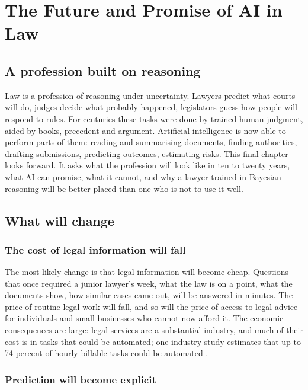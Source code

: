 \chapter{The Future and Promise of AI in Law}
\label{ch:future}

\section{A profession built on reasoning}

Law is a profession of reasoning under uncertainty. Lawyers predict what courts will do, judges decide what probably happened, legislators guess how people will respond to rules. For centuries these tasks were done by trained human judgment, aided by books, precedent and argument. Artificial intelligence is now able to perform parts of them: reading and summarising documents, finding authorities, drafting submissions, predicting outcomes, estimating risks. This final chapter looks forward. It asks what the profession will look like in ten to twenty years, what AI can promise, what it cannot, and why a lawyer trained in Bayesian reasoning will be better placed than one who is not to use it well.

\section{What will change}

\subsection{The cost of legal information will fall}

The most likely change is that legal information will become cheap. Questions that once required a junior lawyer's week, what the law is on a point, what the documents show, how similar cases came out, will be answered in minutes. The price of routine legal work will fall, and so will the price of access to legal advice for individuals and small businesses who cannot now afford it. The economic consequences are large: legal services are a substantial industry, and much of their cost is in tasks that could be automated; one industry study estimates that up to 74 percent of hourly billable tasks could be automated \citep{clio2024}.

\subsection{Prediction will become explicit}

